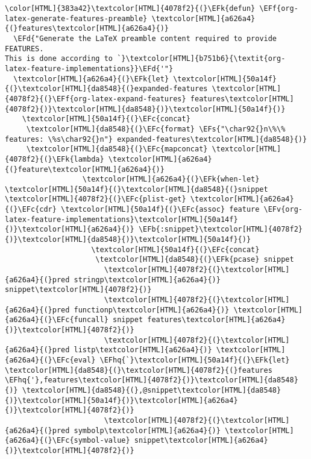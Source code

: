\documentclass{scrartcl}
\newcommand{\EFk}[1]{\textcolor{EFk}{#1}} %
\newcommand{\EFd}[1]{\textcolor{EFd}{\textit{#1}}} %
\newcommand{\EFs}[1]{\textcolor{EFs}{#1}} %
\newcommand{\EFb}[1]{\textcolor{EFb}{#1}} %
\newcommand{\EFc}[1]{\textcolor{EFc}{#1}} %
\newcommand{\EFv}[1]{\textcolor{EFv}{#1}} %
\newcommand{\EFf}[1]{\textcolor{EFf}{#1}} %
\newcommand{\EFhq}[1]{\textcolor{EFhq}{#1}} %
\begin{document}
\begin{enumerate}
\begin{Code}
\begin{Verbatim}[]
\color[HTML]{383a42}\textcolor[HTML]{4078f2}{(}\EFk{defun} \EFf{org-latex-generate-features-preamble} \textcolor[HTML]{a626a4}{(}features\textcolor[HTML]{a626a4}{)}
  \EFd{"Generate the LaTeX preamble content required to provide FEATURES.
This is done according to `}\textcolor[HTML]{b751b6}{\textit{org-latex-feature-implementations}}\EFd{'"}
  \textcolor[HTML]{a626a4}{(}\EFk{let} \textcolor[HTML]{50a14f}{(}\textcolor[HTML]{da8548}{(}expanded-features \textcolor[HTML]{4078f2}{(}\EFf{org-latex-expand-features} features\textcolor[HTML]{4078f2}{)}\textcolor[HTML]{da8548}{)}\textcolor[HTML]{50a14f}{)}
    \textcolor[HTML]{50a14f}{(}\EFc{concat}
     \textcolor[HTML]{da8548}{(}\EFc{format} \EFs{"\char92{}n\%\% features: \%s\char92{}n"} expanded-features\textcolor[HTML]{da8548}{)}
     \textcolor[HTML]{da8548}{(}\EFc{mapconcat} \textcolor[HTML]{4078f2}{(}\EFk{lambda} \textcolor[HTML]{a626a4}{(}feature\textcolor[HTML]{a626a4}{)}
                  \textcolor[HTML]{a626a4}{(}\EFk{when-let} \textcolor[HTML]{50a14f}{(}\textcolor[HTML]{da8548}{(}snippet \textcolor[HTML]{4078f2}{(}\EFc{plist-get} \textcolor[HTML]{a626a4}{(}\EFc{cdr} \textcolor[HTML]{50a14f}{(}\EFc{assoc} feature \EFv{org-latex-feature-implementations}\textcolor[HTML]{50a14f}{)}\textcolor[HTML]{a626a4}{)} \EFb{:snippet}\textcolor[HTML]{4078f2}{)}\textcolor[HTML]{da8548}{)}\textcolor[HTML]{50a14f}{)}
                    \textcolor[HTML]{50a14f}{(}\EFc{concat}
                     \textcolor[HTML]{da8548}{(}\EFk{pcase} snippet
                       \textcolor[HTML]{4078f2}{(}\textcolor[HTML]{a626a4}{(}pred stringp\textcolor[HTML]{a626a4}{)} snippet\textcolor[HTML]{4078f2}{)}
                       \textcolor[HTML]{4078f2}{(}\textcolor[HTML]{a626a4}{(}pred functionp\textcolor[HTML]{a626a4}{)} \textcolor[HTML]{a626a4}{(}\EFc{funcall} snippet features\textcolor[HTML]{a626a4}{)}\textcolor[HTML]{4078f2}{)}
                       \textcolor[HTML]{4078f2}{(}\textcolor[HTML]{a626a4}{(}pred listp\textcolor[HTML]{a626a4}{)} \textcolor[HTML]{a626a4}{(}\EFc{eval} \EFhq{`}\textcolor[HTML]{50a14f}{(}\EFk{let} \textcolor[HTML]{da8548}{(}\textcolor[HTML]{4078f2}{(}features \EFhq{'},features\textcolor[HTML]{4078f2}{)}\textcolor[HTML]{da8548}{)} \textcolor[HTML]{da8548}{(},@snippet\textcolor[HTML]{da8548}{)}\textcolor[HTML]{50a14f}{)}\textcolor[HTML]{a626a4}{)}\textcolor[HTML]{4078f2}{)}
                       \textcolor[HTML]{4078f2}{(}\textcolor[HTML]{a626a4}{(}pred symbolp\textcolor[HTML]{a626a4}{)} \textcolor[HTML]{a626a4}{(}\EFc{symbol-value} snippet\textcolor[HTML]{a626a4}{)}\textcolor[HTML]{4078f2}{)}

\end{Verbatim}
\end{Code}
\end{enumerate}
\end{document}

